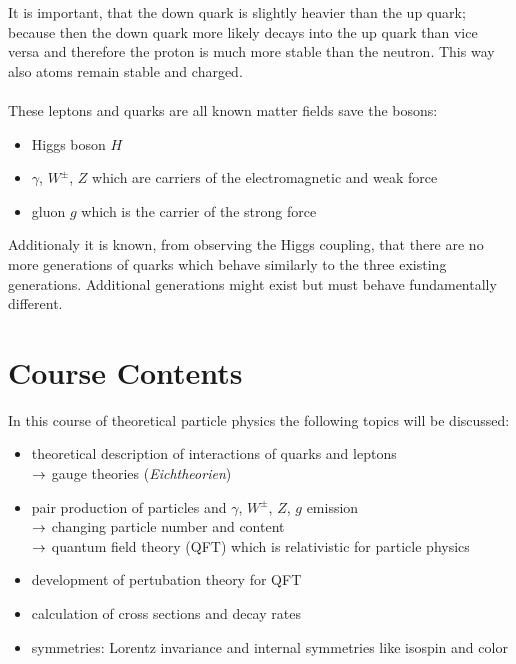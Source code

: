 It is important, that the down quark is slightly heavier than the up quark; because then the down quark more likely decays into the up quark than vice versa and therefore the proton is much more stable than the neutron. This way also atoms remain stable and charged.\\
\\
These leptons and quarks are all known matter fields save the bosons:
\begin{itemize}
\item Higgs boson $H$
\item $\gamma$, $W^\pm$, $Z$ which are carriers of the electromagnetic and weak force
\item gluon $g$ which is the carrier of the strong force
\end{itemize}
Additionaly it is known, from observing the Higgs coupling, that there are no more generations of quarks which behave similarly to the three existing generations. Additional generations might exist but must behave fundamentally different.

\section{Course Contents}
In this course of theoretical particle physics the following topics will be discussed:
\begin{itemize}
\item theoretical description of interactions of quarks and leptons\\
$\rightarrow$ gauge theories (\textit{Eichtheorien})
\item pair production of particles and $\gamma$, $W^\pm$, $Z$, $g$ emission\\
$\rightarrow$ changing particle number and content\\
$\rightarrow$ quantum field theory (QFT) which is relativistic for particle physics
\item development of pertubation theory for QFT
\item calculation of cross sections and decay rates
\item symmetries: Lorentz invariance and internal symmetries like isospin and color
\end{itemize} 

